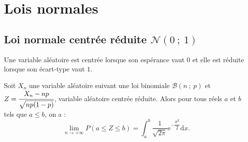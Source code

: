 \documentclass{cornouaille}
\begin{document}
\section{Lois normales}


\subsection{Loi normale centrée réduite $\mathcal{N}(0\ ;\ 1)$}



\begin{definition}
Une variable aléatoire est centrée lorsque son espérance vaut $0$ et elle est réduite lorsque son écart-type vaut $1$.
\end{definition}

\begin{theoreme}
  Soit $X_n$ une variable aléatoire suivant une loi binomiale
  $\mathcal{B}(n\ ;\ p)$ et $Z=\cfrac{X_n-np}{\sqrt{np(1-p)}}$,
  \mbox{variable} aléatoire centrée réduite.  Alors pour tous réels
  $a$ et $b$ tels que $a\leqslant b$, on a :
  $$\lim_{n\rightarrow +\infty}P(a\leqslant
  Z\leqslant b)=\int_a^b \dfrac{1}{\sqrt{2\pi}}
  \textrm{e}^{-\dfrac{x^2}{2}} \textrm{d} x.$$

 ~~

\end{theoreme}
\end{document}
